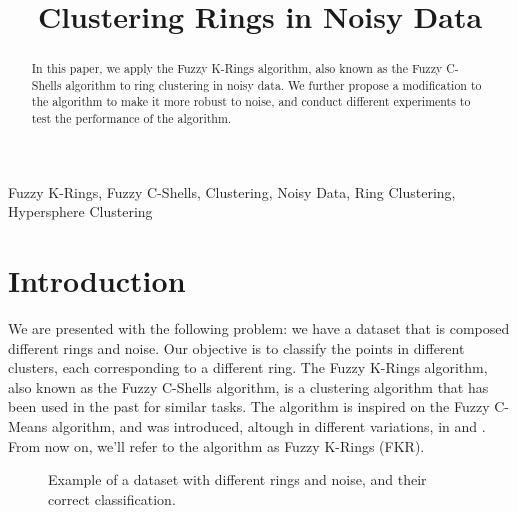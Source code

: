 \documentclass[conference]{IEEEtran}
\begin{document}
\title{Clustering Rings in Noisy Data}

\author{

}
\maketitle

\begin{abstract}
In this paper, we apply the Fuzzy K-Rings algorithm, also known as the Fuzzy C-Shells algorithm to ring clustering in noisy data.
We further propose a modification to the algorithm to make it more robust to noise, and conduct different experiments to test the performance of the algorithm.
\end{abstract}

\begin{IEEEkeywords}
Fuzzy K-Rings, Fuzzy C-Shells, Clustering, Noisy Data, Ring Clustering, Hypersphere Clustering
\end{IEEEkeywords}

\section{Introduction}
We are presented with the following problem: we have a dataset that is composed different rings and noise. Our objective is to classify the points in different clusters,
each corresponding to a different ring. The Fuzzy K-Rings algorithm, also known as the Fuzzy C-Shells algorithm, is a clustering algorithm that has been used in the past
for similar tasks. The algorithm is inspired on the Fuzzy C-Means algorithm, and was introduced, altough in different variations, in \cite{308484} and \cite{DAVE1992713}.
From now on, we'll refer to the algorithm as Fuzzy K-Rings (FKR).
\begin{figure}[H]
    \centering
    \resizebox{0.9\linewidth}{!}{}
    \label{fig:noisy_rings}
    \caption{Example of a dataset with different rings and noise, and their correct classification.}
\end{figure}
\end{document}
